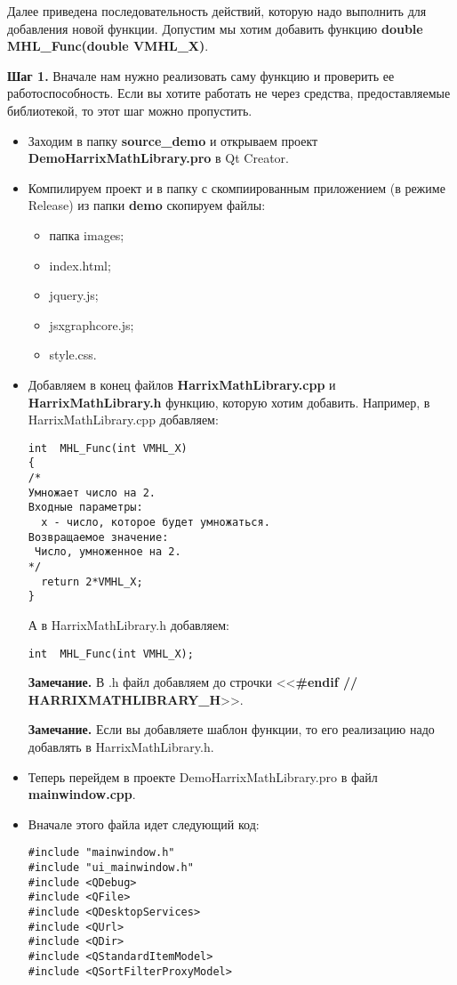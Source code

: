Далее приведена последовательность действий, которую надо выполнить для добавления новой функции. Допустим мы хотим добавить функцию  \textbf{double MHL\_Func(double VMHL\_X)}.

\textbf{Шаг 1.}\label{step1} Вначале нам нужно реализовать саму функцию и проверить ее работоспособность. Если вы хотите работать не через средства, предоставляемые библиотекой, то этот шаг можно пропустить.

\begin{itemize}
\item Заходим в папку \textbf{source\_demo} и открываем проект \textbf{DemoHarrixMathLibrary.pro} в Qt Creator.
\item Компилируем проект и в папку с скомпиированным приложением (в режиме Release) из папки \textbf{demo} скопируем файлы:
\begin{itemize}
\item  папка images;
\item  index.html;
\item  jquery.js;
\item  jsxgraphcore.js;
\item  style.css.
\end {itemize}
\item Добавляем в конец файлов \textbf{HarrixMathLibrary.cpp} и \textbf{HarrixMathLibrary.h} функцию, которую хотим добавить. Например, в HarrixMathLibrary.cpp добавляем:
\begin{lstlisting}[label=examplefunction01, caption=Что добавляем в HarrixMathLibrary.cpp]
int  MHL_Func(int VMHL_X)
{
/*
Умножает число на 2.
Входные параметры:
  x - число, которое будет умножаться.
Возвращаемое значение:
 Число, умноженное на 2.
*/
  return 2*VMHL_X;
}
\end{lstlisting}
А в HarrixMathLibrary.h добавляем:
\begin{lstlisting}[label=examplefunction02, caption=Что добавляем в HarrixMathLibrary.h]
int  MHL_Func(int VMHL_X);
\end{lstlisting}
\textbf{Замечание.} В .h файл добавляем до строчки <<\textbf{\#endif // HARRIXMATHLIBRARY\_H}>>.

\textbf{Замечание.} Если вы добавляете шаблон функции, то его реализацию надо добавлять в HarrixMathLibrary.h.
\item Теперь перейдем в проекте DemoHarrixMathLibrary.pro в файл \textbf{mainwindow.cpp}.
\item Вначале этого файла идет следующий код:
\begin{lstlisting}[label=examplefunction03, caption=mainwindow.cpp]
#include "mainwindow.h"
#include "ui_mainwindow.h"
#include <QDebug>
#include <QFile>
#include <QDesktopServices>
#include <QUrl>
#include <QDir>
#include <QStandardItemModel>
#include <QSortFilterProxyModel>


\end{lstlisting}
\end{itemize}
